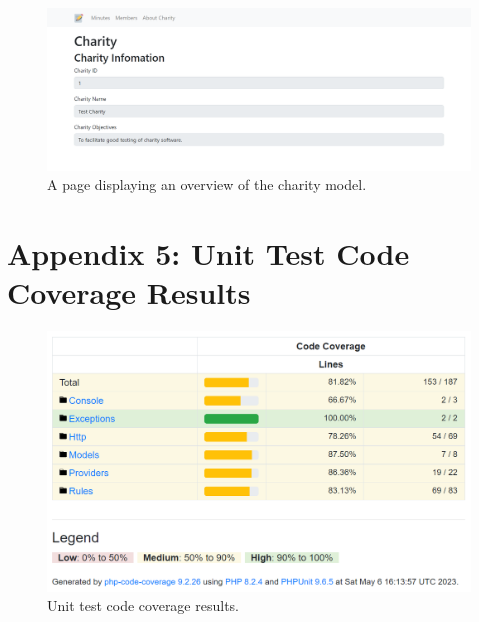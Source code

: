 \documentclass{UoYCSproject}
\begin{document}
\begin{figure}[H]
\begin{center}
\includegraphics[width=\textwidth]{"./assets/apendix/frontend-screenshots/About Charity - Cropped.png"}
\end{center}
\caption{A page displaying an overview of the charity model.}
\end{figure}



\newpage
\section{Appendix 5: Unit Test Code Coverage Results}
\label{sec:apendix_unit_tests}

\begin{figure}[H]
\begin{center}
\includegraphics[width=1\textwidth]{"./assets/apendix/Code Coverage Results.PNG"}
\end{center}
\caption{Unit test code coverage results.}
\end{figure}



\printbibliography
\end{document}
